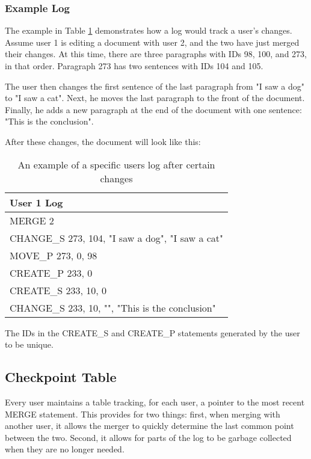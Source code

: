 \subsubsection{Example Log}
The example in Table \ref{table:ex_log} demonstrates how a log would track a user's changes. Assume user 1 is editing a document
with user 2, and the two have just merged their changes. At this time, there are three paragraphs with IDs 98, 100,
and  273, in that order. Paragraph 273 has two sentences with IDs 104 and 105. 

The user then changes the first sentence of the last paragraph from "I saw a dog" to "I saw a cat". Next, he moves the last
paragraph to the front of the document. Finally, he adds a new paragraph at the end of the document with one sentence:
"This is the conclusion".

After these changes, the document will look like this:

\begin{table}[h!]
\begin{center}
 \begin{tabular} {|l|}
  \hline
   User 1 Log \\
  \hline \hline
   MERGE 2 \\
   CHANGE\_S 273, 104, "I saw a dog", "I saw a cat" \\
   MOVE\_P 273, 0, 98 \\
   CREATE\_P 233, 0 \\
   CREATE\_S 233, 10, 0 \\
   CHANGE\_S 233, 10, "", "This is the conclusion" \\
  \hline
 \end{tabular}
\end{center}
\caption{An example of a specific users log after certain changes}
\label{table:ex_log}
\end{table}

The IDs in the CREATE\_S and CREATE\_P statements generated by the user to be unique.

\subsection{Checkpoint Table}

Every user maintains a table tracking, for each user, a pointer to the most recent MERGE statement.
This provides for two things: first, when merging with another user, it allows the merger
to quickly determine the last common point between the two. Second, it allows for parts
of the log to be garbage collected when they are no longer needed.

